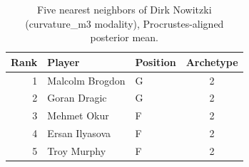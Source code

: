 \begin{table}[htbp]
  \centering\small
  \begin{tabular}{rllc}
    \toprule
    Rank & Player & Position & Archetype \\
    \midrule
    1 & Malcolm Brogdon & G & 2 \\
    2 & Goran Dragic & G & 2 \\
    3 & Mehmet Okur & F & 2 \\
    4 & Ersan Ilyasova & F & 2 \\
    5 & Troy Murphy & F & 2 \\
    \bottomrule
  \end{tabular}
  \caption{Five nearest neighbors of Dirk Nowitzki (curvature_m3 modality), Procrustes-aligned posterior mean.}
  \label{tab:Dirk_Nowitzki_neighbors_curvature_m3}
\end{table}

